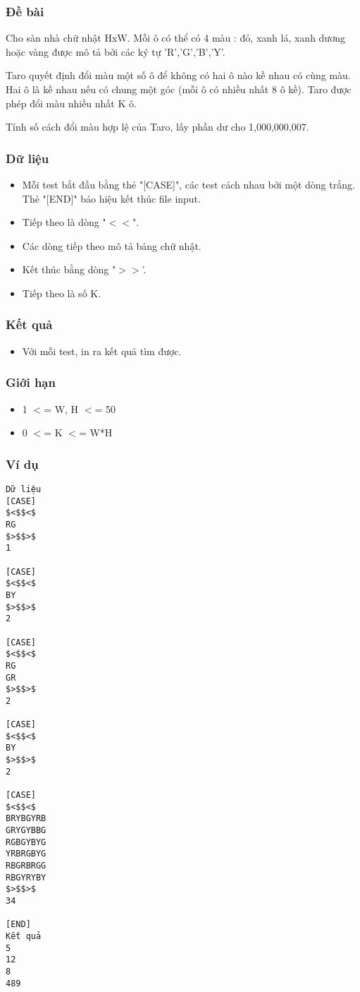 



\subsubsection{   Đề bài  }

   Cho sàn nhà chữ nhật HxW. Mỗi ô có thể có 4 màu : đỏ, xanh lá, xanh dương hoặc vàng được mô tả bởi các ký tự 'R','G','B','Y'.  

   Taro quyết định đổi màu một số ô để không có hai ô nào kề nhau có cùng màu. Hai ô là kề nhau nếu có chung một góc (mỗi ô có nhiều nhất 8 ô kề). Taro được phép đổi màu nhiều nhất K ô.  

   Tính số cách đổi màu hợp lệ của Taro, lấy phần dư cho 1,000,000,007.  

\subsubsection{   Dữ liệu  }
\begin{itemize}
	\item     Mỗi test bắt đầu bằng thẻ "[CASE]", các test cách nhau bởi một dòng trắng. Thẻ "[END]" báo hiệu kết thúc file input.   
	\item     Tiếp theo là dòng "$<$$<$".   
	\item     Các dòng tiếp theo mô tả bảng chữ nhật.   
	\item     Kết thúc bằng dòng "$>$$>$'.   
	\item     Tiếp theo là số K.   
\end{itemize}

\subsubsection{   Kết quả  }
\begin{itemize}
	\item     Với mỗi test, in ra kết quả tìm được.   
\end{itemize}

\subsubsection{   Giới hạn  }
\begin{itemize}
	\item     1 $<$= W, H $<$= 50   
	\item     0 $<$= K $<$= W*H   
\end{itemize}

\subsubsection{   Ví dụ  }
\begin{verbatim}
Dữ liệu
[CASE]
$<$$<$
RG
$>$$>$
1

[CASE]
$<$$<$
BY
$>$$>$
2

[CASE]
$<$$<$
RG
GR
$>$$>$
2

[CASE]
$<$$<$
BY
$>$$>$
2

[CASE]
$<$$<$ 	
BRYBGYRB
GRYGYBBG
RGBGYBYG
YRBRGBYG
RBGRBRGG
RBGYRYBY
$>$$>$
34

[END]
Kết quả
5
12
8
489
\end{verbatim}